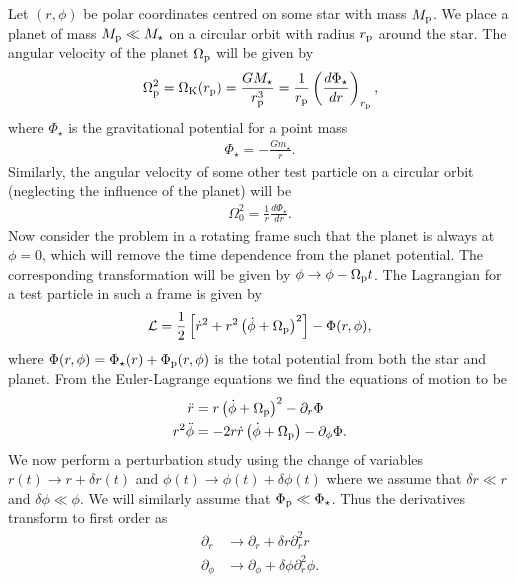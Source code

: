 Let $(r,\phi)$ be polar coordinates centred on some star with mass $M_{\rm p}$.
We place a planet of mass $M_{\rm p} \ll M_\star$ on a circular orbit with radius $r_{\rm p}$ around the star.
The angular velocity of the planet $\Omega_{\rm p}$ will be given by 
\begin{align}
    \Omega_{\rm p}^2 = \Omega_{\rm K}(r_{\rm p}) = \frac{G M_\star}{r_{\rm p}^3} = \frac{1}{r_{\rm p}} \left( \frac{d\Phi_\star}{dr} \right) _{r_{\rm p}},
\end{align}
where $\Phi_\star$ is the gravitational potential for a point mass
\begin{align}
    \Phi_\star = - \frac{G m_\star}{r}.
\end{align}
Similarly, the angular velocity of some other test particle on a circular orbit (neglecting the influence of the planet) will be
\begin{align}
    \Omega_0^2 = \frac{1}{r} \frac{d\Phi_\star}{dr}.
\end{align}
Now consider the problem in a rotating frame such that the planet is always at $\phi=0$, which will remove the time dependence from the planet potential. 
The corresponding transformation will be given by $\phi \rightarrow \phi - \Omega_{\rm p} t$.
The Lagrangian for a test particle in such a frame is given by 
\begin{align}
    \mathcal{L} = \frac{1}{2} \left[ \dot{r}^2 + r^2 \left( \dot{\phi} + \Omega_{\rm p}  \right)^2 \right] - \Phi (r, \phi),
\end{align}
where $\Phi (r,\phi) = \Phi_\star (r) + \Phi_{\rm p} (r, \phi)$ is the total potential from both the star and planet.
From the Euler-Lagrange equations we find the equations of motion to be
\begin{align}
    \ddot{r} &= r \left( \dot{\phi} + \Omega_{\rm p} \right)^2 - \partial_r \Phi \label{eq:EOM_rad} \\
    r^2 \ddot{\phi} &= - 2 r \dot{r} \left( \dot{\phi} + \Omega_{\rm p}  \right) - \partial_\phi \Phi. \label{eq:EOM_az}
\end{align}
We now perform a perturbation study using the change of variables $r(t) \rightarrow r + \delta r (t)$  and $\phi (t) \rightarrow \phi (t) + \delta \phi (t)$ where we assume that $\delta r \ll r$ and $\delta \phi \ll \phi$.
We will similarly assume that $\Phi_{\rm p} \ll \Phi_\star$.
Thus the derivatives transform to first order as
\begin{align}
    \partial_r &\rightarrow \partial_r + \delta r \partial_r^2 r \\
    \partial_\phi &\rightarrow \partial_\phi + \delta \phi \partial_r^2 \phi.
\end{align}

